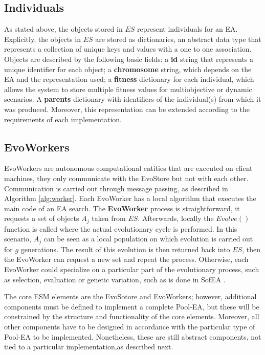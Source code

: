 \subsection{Individuals}
As stated above, the objects stored in $ES$ represent individuals for an EA. 
Explicitly, the objects in $ES$ are stored as dictionaries, an abstract data type that represents a collection of unique keys and values with a one to one association.
Objects are described by the following basic fields:
a \textbf{id} string that represents a unique identifier for each object;
a \textbf{chromosome} string, which depends on the EA and the representation used;
a \textbf{fitness} dictionary for each individual, which allows the system to store multiple fitness values for multiobjective
or dynamic scenarios.
A \textbf{parents} dictionary with identifiers of the individual(s) from which it was produced.
Moreover, this representation can be extended according to the requirements of each implementation. 



\subsection{EvoWorkers}
EvoWorkers are autonomous computational entities that are executed on client machines, they only communicate with the EvoStore but not with each other. Communication is carried out through message passing, as described in Algorithm \ref{alg:worker}. Each EvoWorker has a local algorithm that executes the main code of an EA search. The \textbf{EvoWorker} process is straightforward, it requests a set of objects $A_j$ taken from $ES$.
Afterwards, locally the $Evolve()$ function is called where the actual evolutionary cycle is performed. In this scenario, $A_j$ can be seen as a local population on which evolution is carried out for $g$ generations. The result of this evolution is then returned back into $ES$, then the EvoWorker can request a new set and repeat the process. Otherwise, each EvoWorker could specialize on a particular part of the evolutionary process, such as selection, evaluation or genetic variation,
such as is done in SofEA \cite{sofea1}.

The core ESM elements are the EvoSotore and EvoWorkers; however, additional components must be defined to implement a complete Pool-EA, but these will be constrained by the structure and functionality of the core elements.
Moreover, all other components have to be designed in accordance with the particular type of Pool-EA to be implemented. Nonetheless, these are still abstract components, not tied to a particular implementation,as described next.


